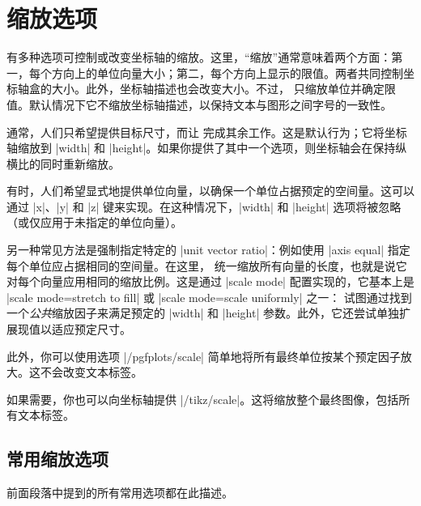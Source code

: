 
\section{缩放选项}

有多种选项可控制或改变坐标轴的缩放。这里，“缩放”通常意味着两个方面：第一，每个方向上的单位向量大小；第二，每个方向上显示的限值。两者共同控制坐标轴盒的大小。此外，坐标轴描述也会改变大小。不过，\PGFPlots{} 只缩放单位并确定限值。默认情况下它不缩放坐标轴描述，以保持文本与图形之间字号的一致性。

通常，人们只希望提供目标尺寸，而让 \PGFPlots{} 完成其余工作。这是默认行为；它将坐标轴缩放到 |width| 和 |height|。如果你提供了其中一个选项，则坐标轴会在保持纵横比的同时重新缩放。

有时，人们希望显式地提供单位向量，以确保一个单位占据预定的空间量。这可以通过 |x|、|y| 和 |z| 键来实现。在这种情况下，|width| 和 |height| 选项将被忽略（或仅应用于未指定的单位向量）。

另一种常见方法是强制指定特定的 |unit vector ratio|：例如使用 |axis equal| 指定每个单位应占据相同的空间量。在这里，\PGFPlots{} 统一缩放所有向量的长度，也就是说它对每个向量应用相同的缩放比例。这是通过 |scale mode| 配置实现的，它基本上是 |scale mode=stretch to fill| 或 |scale mode=scale uniformly| 之一：\PGFPlots{} 试图通过找到一个\emph{公共}缩放因子来满足预定的 |width| 和 |height| 参数。此外，它还尝试单独扩展现值以适应预定尺寸。

此外，你可以使用选项 |/pgfplots/scale| 简单地将所有最终单位按某个预定因子放大。这不会改变文本标签。

如果需要，你也可以向坐标轴提供 |/tikz/scale|。这将缩放整个最终图像，包括所有文本标签。


\subsection{常用缩放选项}

前面段落中提到的所有常用选项都在此描述。

